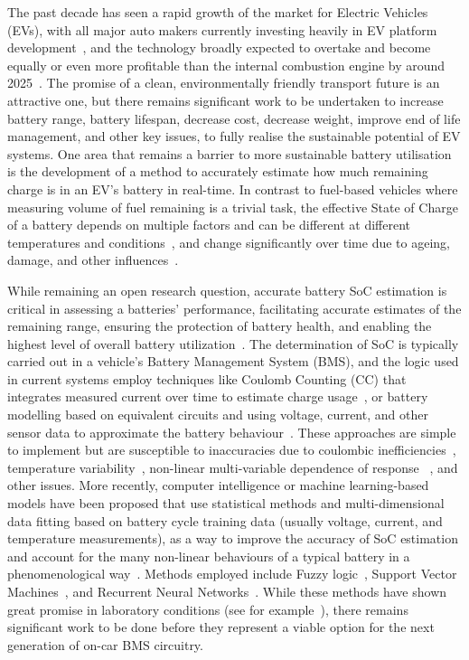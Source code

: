 %
%
The past decade has seen a rapid growth of the market for Electric Vehicles (EVs), with all major auto makers currently investing heavily in EV platform development~\cite{iea_global_2023}, and the technology broadly expected to overtake and become equally or even more profitable than the internal combustion engine by around 2025~\cite{baik_making_2019}.
The promise of a clean, environmentally friendly transport future is an attractive one, but there remains significant work to be undertaken to increase battery range, battery lifespan, decrease cost, decrease weight, improve end of life management, and other key issues, to fully realise the sustainable potential of EV systems.
One area that remains a barrier to more sustainable battery utilisation is the development of a method to accurately estimate how much remaining charge is in an EV's battery in real-time.
In contrast to fuel-based vehicles where measuring volume of fuel remaining is a trivial task, the effective State of Charge of a battery depends on multiple factors and can be different at different temperatures and conditions~\cite{xing_state_2014}, and change significantly over time due to ageing, damage, and other influences~\cite{johansson_neural_2018}.

%
%
While remaining an open research question, accurate battery SoC estimation is critical in assessing a batteries' performance, facilitating accurate estimates of the remaining range, ensuring the protection of battery health, and enabling the highest level of overall battery utilization~\cite{yamin_embedded_2014}.
The determination of SoC is typically carried out in a vehicle's Battery Management System (BMS), and the logic used in current systems employ techniques like Coulomb Counting (CC) that integrates measured current over time to estimate charge usage~\cite{robust_SoC}, or battery modelling based on equivalent circuits and using voltage, current, and other sensor data to approximate the battery behaviour~\cite{6953745,ng_enhanced_2009,robust_SoC}.
These approaches are simple to implement but are susceptible to inaccuracies due to coulombic inefficiencies~\cite{Smith_2010}, temperature variability~\cite{xing_state_2014}, non-linear multi-variable dependence of response ~\cite{hansen_support_2005,anton_battery_2013,he_state_2014}, and other issues.
More recently, computer intelligence or machine learning-based models have been proposed that use statistical methods and multi-dimensional data fitting based on battery cycle training data (usually voltage, current, and temperature measurements), as a way to improve the accuracy of SoC estimation and account for the many non-linear behaviours of a typical battery in a phenomenological way~\cite{hansen_support_2005,anton_battery_2013,he_state_2014}.
Methods employed include Fuzzy logic~\cite{malkhandi_fuzzy_2006}, Support Vector Machines~\cite{hansen_support_2005, anton_battery_2013}, and Recurrent Neural Networks~\cite{song_lithium-ion_2018,Chemali2017,mamo_long_2020,jiao_gru-rnn_2020,xiao_accurate_2019,javid_adaptive_2020,zhang_deep_2020}.
While these methods have shown great promise in laboratory conditions (see for example~\cite{jiao_gru-rnn_2020}), there remains significant work to be done before they represent a viable option for the next generation of on-car BMS circuitry.

